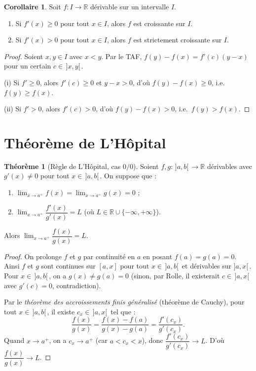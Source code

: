 \documentclass[12pt,a4paper,openany]{book}
\theoremstyle{definition}
\newtheorem{theoreme}{Théorème}[chapter]
\newtheorem{corollaire}{Corollaire}[chapter]
\newcommand{\R}{\mathbb{R}}
\begin{document}
\begin{corollaire}\label{cor:derivee-positive-croissante}
Soit $f \colon I \to \R$ dérivable sur un intervalle $I$.
\begin{enumerate}[label=\textup{(\roman*)}]
  \item Si $f'(x) \geqslant 0$ pour tout $x \in I$, alors $f$ est croissante sur $I$.
  \item Si $f'(x) > 0$ pour tout $x \in I$, alors $f$ est strictement croissante sur $I$.
\end{enumerate}
\end{corollaire}

\begin{proof}
Soient $x, y \in I$ avec $x < y$. Par le TAF, $f(y) - f(x) = f'(c)(y-x)$ pour un certain $c \in \,]x,y[\,$.

(i) Si $f' \geqslant 0$, alors $f'(c) \geqslant 0$ et $y - x > 0$, d'où $f(y) - f(x) \geqslant 0$, i.e.\ $f(y) \geqslant f(x)$.

(ii) Si $f' > 0$, alors $f'(c) > 0$, d'où $f(y) - f(x) > 0$, i.e.\ $f(y) > f(x)$.
\end{proof}

\section{Théorème de L'Hôpital}\label{sec:hopital}

\begin{theoreme}[Règle de L'Hôpital, cas $0/0$]\label{thm:hopital}
Soient $f, g \colon \,]a, b[\, \to \R$ dérivables avec $g'(x) \neq 0$ pour tout $x \in \,]a, b[\,$. On suppose que :
\begin{enumerate}[label=\textup{(\roman*)}]
  \item $\lim_{x \to a^+} f(x) = \lim_{x \to a^+} g(x) = 0$ ;
  \item $\lim_{x \to a^+} \dfrac{f'(x)}{g'(x)} = L$ \quad (où $L \in \R \cup \{-\infty, +\infty\}$).
\end{enumerate}
Alors $\lim_{x \to a^+} \dfrac{f(x)}{g(x)} = L$.
\end{theoreme}

\begin{proof}
On prolonge $f$ et $g$ par continuité en $a$ en posant $f(a) = g(a) = 0$. Ainsi $f$ et $g$ sont continues sur $[a, x]$ pour tout $x \in \,]a, b[\,$ et dérivables sur $]a, x[\,$. Pour $x \in \,]a, b[\,$, on a $g(x) \neq g(a) = 0$ (sinon, par Rolle, il existerait $c \in \,]a, x[\,$ avec $g'(c) = 0$, contradiction).

Par le \emph{théorème des accroissements finis généralisé} (théorème de Cauchy), pour tout $x \in \,]a, b[\,$, il existe $c_x \in \,]a, x[\,$ tel que :
\[
  \frac{f(x)}{g(x)} = \frac{f(x) - f(a)}{g(x) - g(a)} = \frac{f'(c_x)}{g'(c_x)}.
\]
Quand $x \to a^+$, on a $c_x \to a^+$ (car $a < c_x < x$), donc $\dfrac{f'(c_x)}{g'(c_x)} \to L$. D'où $\dfrac{f(x)}{g(x)} \to L$.
\end{proof}
\end{document}
